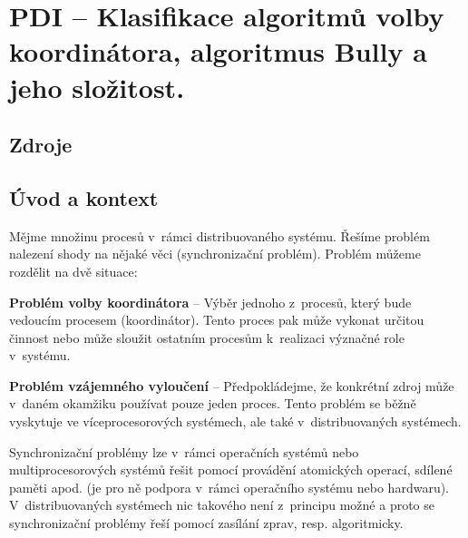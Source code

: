 

\graphicspath{{pdi/volba_koordinatora/figures}}


\chapter{PDI -- Klasifikace algoritmů volby koordinátora, algoritmus Bully a jeho složitost.}


\section{Zdroje}

\begin{compactitem}
    \item {}
    \item {}
\end{compactitem}


\section{Úvod a kontext}

\begin{compactitem}
    \item Mějme množinu procesů v~rámci distribuovaného systému. Řešíme problém  nalezení shody na nějaké věci (synchronizační problém). Problém můžeme rozdělit na dvě situace:
    \begin{compactitem}
        \item \textbf{Problém volby koordinátora} -- Výběr jednoho z~procesů, který bude vedoucím procesem (koordinátor). Tento proces pak může vykonat určitou činnost nebo může sloužit ostatním procesům k~realizaci  význačné role v~systému.
        \item \textbf{Problém vzájemného vyloučení} -- Předpokládejme, že konkrétní zdroj může v~daném okamžiku používat pouze jeden proces. Tento problém se běžně vyskytuje ve víceprocesorových systémech, ale také v~distribuovaných systémech.
    \end{compactitem}
    \item Synchronizační problémy lze v~rámci operačních systémů nebo multiprocesorových systémů řešit pomocí provádění atomických operací, sdílené paměti apod. (je pro ně podpora v~rámci operačního systému nebo hardwaru). V~distribuovaných systémech nic takového není z~principu možné a proto se synchronizační problémy řeší pomocí zasílání zprav, resp. algoritmicky.
\end{compactitem}

